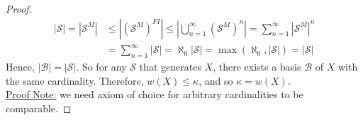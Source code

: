 \documentclass{treatise}
\begin{document}
\begin{shaded}
\begin{proof}
\begin{align*}
    |\mathcal{S}| = |\mathcal{S}^M| & \leq \left| (\mathcal{S}^{M})^{FI} \right| \leq \left| \bigcup_{n = 1}^\infty (\mathcal{S}^{M})^n \right| = \sum_{n = 1}^\infty |\mathcal{S}^{M}|^n
    \\
    & = \sum_{n = 1}^\infty |\mathcal{S}| = \aleph_0 |\mathcal{S}| = \max(\aleph_0, |\mathcal{S}|) = |\mathcal{S}|
\end{align*}
Hence, $|\mathcal{B}| = |\mathcal{S}|$. So for any $\mathcal{S}$ that generates $X$, there exists a basis $\mathcal{B}$ of $X$ with the same cardinality. Therefore, $w(X) \leq \kappa$, and so $\kappa = w(X)$.
\\
\underline{Proof Note:} we need axiom of choice for arbitrary cardinalities to be comparable.
\end{proof}
\end{shaded}
\end{document}

